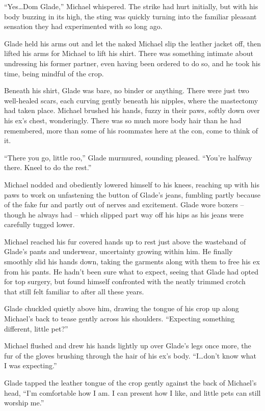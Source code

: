 ``Yes\ldots{}Dom Glade,'' Michael whispered. The strike had hurt initially, but with his body buzzing in its high, the sting was quickly turning into the familiar pleasant sensation they had experimented with so long ago.

Glade held his arms out and let the naked Michael slip the leather jacket off, then lifted his arms for Michael to lift his shirt. There was something intimate about undressing his former partner, even having been ordered to do so, and he took his time, being mindful of the crop.

Beneath his shirt, Glade was bare, no binder or anything. There were just two well-healed scars, each curving gently beneath his nipples, where the mastectomy had taken place. Michael brushed his hands, fuzzy in their paws, softly down over his ex's chest, wonderingly. There was so much more body hair than he had remembered, more than some of his roommates here at the con, come to think of it.

``There you go, little roo,'' Glade murmured, sounding pleased. ``You're halfway there. Kneel to do the rest.''

Michael nodded and obediently lowered himself to his knees, reaching up with his paws to work on unfastening the button of Glade's jeans, fumbling partly because of the fake fur and partly out of nerves and excitement. Glade wore boxers -- though he always had -- which slipped part way off his hips as his jeans were carefully tugged lower.

Michael reached his fur covered hands up to rest just above the wasteband of Glade's pants and underwear, uncertainty growing within him. He finally smoothly slid his hands down, taking the garments along with them to free his ex from his pants. He hadn't been sure what to expect, seeing that Glade had opted for top surgery, but found himself confronted with the neatly trimmed crotch that still felt familiar to after all these years.

Glade chuckled quietly above him, drawing the tongue of his crop up along Michael's back to tease gently across his shoulders. ``Expecting something different, little pet?''

Michael flushed and drew his hands lightly up over Glade's legs once more, the fur of the gloves brushing through the hair of his ex's body. ``I\ldots{}don't know what I was expecting.''

Glade tapped the leather tongue of the crop gently against the back of Michael's head, ``I'm comfortable how I am. I can present how I like, and little pets can still worship me.''


